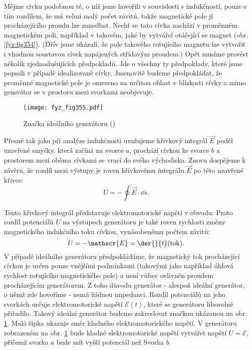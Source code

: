   Mějme cívku podobnou té, o níž jsme hovořili v souvislosti s indukčností, pouze s tím rozdílem, 
  že má velmi malý počet závitů, takže magnetické pole jí procházejícího proudu lze zanedbat. Nechť 
  se tato cívka nachází v proměnném magnetickém poli, například v takovém, jaké by vytvářel 
  otáčející se magnet (obr. \ref{fyz:fig354}). (Dřív jsme ukázali, že pole takového rotujícího 
  magnetu lze vytvořit i vhodnou soustavou cívek napájených střídavým proudem.) Opět musíme provést 
  několik zjednodušujících předpokladů. Jde o všechny ty předpoklady, které jsme popsali v případě 
  idealizované cívky. Jmenovitě budeme předpokládat, že proměnné magnetické pole je omezeno na 
  určitou oblast v blízkosti cívky a mimo generátor se v prostoru mezi svorkami neobjevuje.

  \begin{figure}[ht!] %
    \centering
    \texttt{[image: fyz\_fig355.pdf]}
    \caption{Značka ideálního generátoru
             (\cite[s.~396]{Feynman02})}
    \label{fyz:fig355}
  \end{figure}
  
  Přesně tak jako při analýze indukčnosti uvažujeme křivkový integrál \(\vec{E}\) podél uzavřené 
  smyčky, která začíná na svorce \(a\), prochází cívkou ke svorce \(b\) a prostorem mezi oběma 
  cívkami se vrací do svého východiska. Znovu dospějeme k závěru, že rozdíl mezi výstupy je roven 
  křivkovému integrálu \(\vec{E}\) po této uzavřené křivce:
  \begin{equation}\label{fyz:eq478}
   U = -\oint\vec{E}\cdot\dd{s}.
  \end{equation}

  Tento křivkový integrál představuje elektromotorické napětí v obvodu. Proto rozdíl potenciálů 
  \(U\) na výstupech generátoru je také roven rychlosti změny magnetického indukčního toku cívkou, 
  vynásobenému počtem závitů:
  \begin{equation}\label{fyz:eq479}
   U = -\mathscr{E} = \der{ }{t}(\text{tok}).
  \end{equation}
  V případě ideálního generátoru předpokládáme, že magnetický tok procházející cívkou je určen 
  pouze vnějšími podmínkami (takovými jako například úhlová rychlost rotujícího magnetického pole) 
  a není vůbec ovlivněn proudem procházejícím generátorem. Z toho důvodu generátor - alespoň 
  ideální generátor, o němž zde hovoříme - nemá žádnou impedanci. Rozdíl potenciálů na jeho 
  svorkách určuje elektromotorické napětí \(\mathscr{E}(t)\), které se generátoru libovolně 
  přiřadilo. Takový ideální generátor budeme zakreslovat značkou ukázanou na obr. \ref{fyz:fig355}. 
  Malá šipka ukazuje směr kladného elektromotorického napětí. V generátoru zobrazeném na obr. 
  \ref{fyz:fig355} bude kladné elektromotorické napětí vytvářet napětí \(U=\mathscr{E}\), přičemž 
  svorka \(a\) bude mít vyšší potenciál než Svorka \(b\).
  
